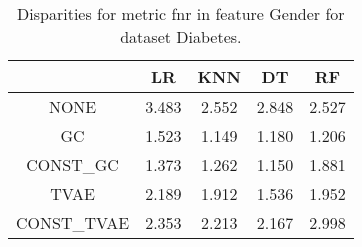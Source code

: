 \begin{table}
\caption{Disparities for metric fnr in feature Gender for dataset Diabetes.}
\label{tab:disp-DIABETES-Gender-fnr}
\begin{tabular}{ccccc}
\toprule
 & LR & KNN & DT & RF \\
\midrule
NONE & 3.483 & 2.552 & 2.848 & 2.527 \\
GC & 1.523 & 1.149 & 1.180 & 1.206 \\
CONST\_GC & 1.373 & 1.262 & 1.150 & 1.881 \\
TVAE & 2.189 & 1.912 & 1.536 & 1.952 \\
CONST\_TVAE & 2.353 & 2.213 & 2.167 & 2.998 \\
\bottomrule
\end{tabular}
\end{table}
